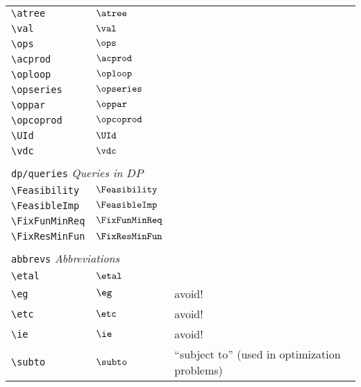 \begin{longtable}{lll}
 {\color[rgb]{0.5,0.5,0.5}\texttt{\textbackslash atree}} & $\atree$ & \\ 
 {\color[rgb]{0.5,0.5,0.5}\texttt{\textbackslash val}} & $\val$ & \\ 
 {\color[rgb]{0.5,0.5,0.5}\texttt{\textbackslash ops}} & $\ops$ & \\ 
 {\color[rgb]{0.5,0.5,0.5}\texttt{\textbackslash acprod}} & $\acprod$ & \\ 
 {\color[rgb]{0.5,0.5,0.5}\texttt{\textbackslash oploop}} & $\oploop$ & \\ 
 {\color[rgb]{0.5,0.5,0.5}\texttt{\textbackslash opseries}} & $\opseries$ & \\ 
 {\color[rgb]{0.5,0.5,0.5}\texttt{\textbackslash oppar}} & $\oppar$ & \\ 
 {\color[rgb]{0.5,0.5,0.5}\texttt{\textbackslash opcoprod}} & $\opcoprod$ & \\ 
 {\color[rgb]{0.5,0.5,0.5}\texttt{\textbackslash UId}} & $\UId$ & \\ 
 {\color[rgb]{0.5,0.5,0.5}\texttt{\textbackslash vdc}} & $\vdc$ & \\ 
  &  & \\ 
 \multicolumn{3}{l}{{\color[rgb]{0.5,0.5,0.5}\texttt{dp/queries}} \emph{Queries in $DP$}}\\ 
 \hline
{\color[rgb]{0.5,0.5,0.5}\texttt{\textbackslash Feasibility}} & $\Feasibility$ & \\ 
 {\color[rgb]{0.5,0.5,0.5}\texttt{\textbackslash FeasibleImp}} & $\FeasibleImp$ & \\ 
 {\color[rgb]{0.5,0.5,0.5}\texttt{\textbackslash FixFunMinReq}} & $\FixFunMinReq$ & \\ 
 {\color[rgb]{0.5,0.5,0.5}\texttt{\textbackslash FixResMinFun}} & $\FixResMinFun$ & \\ 
  &  & \\ 
 \multicolumn{3}{l}{{\color[rgb]{0.5,0.5,0.5}\texttt{abbrevs}} \emph{Abbreviations}}\\ 
 \hline
\hline
{\color[rgb]{0.5,0.5,0.5}\texttt{\textbackslash etal}} & $\etal$ & \\ 
 {\color[rgb]{0.5,0.5,0.5}\texttt{\textbackslash eg}} & $\eg$ &  avoid!\\ 
 {\color[rgb]{0.5,0.5,0.5}\texttt{\textbackslash etc}} & $\etc$ &  avoid!\\ 
 {\color[rgb]{0.5,0.5,0.5}\texttt{\textbackslash ie}} & $\ie$ &  avoid!\\ 
 {\color[rgb]{0.5,0.5,0.5}\texttt{\textbackslash subto}} & $\subto$ &  ``subject to'' (used in optimization problems)\\ 

\end{longtable}
